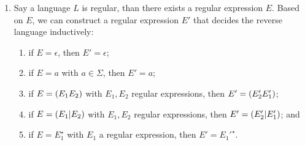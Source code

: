 \documentclass{article}
\begin{document}
\begin{exercise}
\begin{answer}
\begin{enumerate}
 \item Say a language $L$ is regular, than there exists a regular expression $E$. Based on $E$, we can construct a regular expression $E'$ that decides the reverse language inductively:
 \begin{enumerate}
  \item if $E=\epsilon$, then $E'=\epsilon$;
  \item if $E=a$ with $a\in\Sigma$, then $E'=a$;
  \item if $E=\left( E_1E_2 \right)$ with $E_1,E_2$ regular expressions, then $E'=\left( E_2'E_1' \right)$;
  \item if $E=\left( E_1|E_2 \right)$ with $E_1,E_2$ regular expressions, then $E'=\left( E_2'|E_1' \right)$; and
  \item if $E=E_1^{\star}$ with $E_1$ a regular expression, then $E'=E_1'^{\star}$.
 \end{enumerate}
\end{enumerate}

\end{answer}
\end{exercise}
\end{document}
